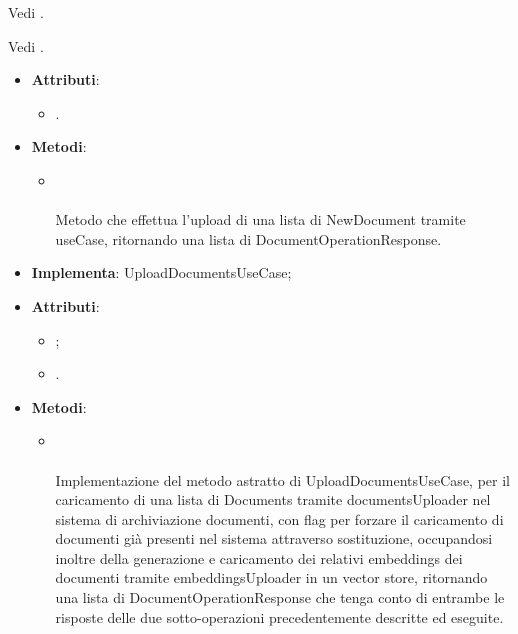 \documentclass[10pt, a4paper]{article}
\begin{document}
Vedi .

Vedi .



\label{UploadDocumentsControllerDettaglio}
\begin{itemize}
    \item \textbf{Attributi}:
    \begin{itemize}
        \item {}.
    \end{itemize}
    \item \textbf{Metodi}:
    \begin{itemize}
        \item {}\\ \\
        Metodo che effettua l'upload di una lista di NewDocument tramite useCase, ritornando una lista di DocumentOperationResponse.        
    \end{itemize}
\end{itemize}



\label{UploadDocumentsServiceDettaglio}
\begin{itemize}
    \item \textbf{Implementa}: UploadDocumentsUseCase;
    \item \textbf{Attributi}:
    \begin{itemize}
        \item {};
        \item {}.  
    \end{itemize}
    \item \textbf{Metodi}:
    \begin{itemize}
        \item {}\\ \\
        Implementazione del metodo astratto di UploadDocumentsUseCase, per il caricamento di una lista di Documents tramite documentsUploader nel sistema di archiviazione documenti, con flag per forzare il caricamento di documenti già presenti nel sistema attraverso sostituzione, occupandosi inoltre della generazione e caricamento dei relativi embeddings dei documenti tramite embeddingsUploader in un vector store, ritornando una lista di DocumentOperationResponse che tenga conto di entrambe le risposte delle due sotto-operazioni precedentemente descritte ed eseguite.
    \end{itemize}
\end{itemize}
\end{document}
